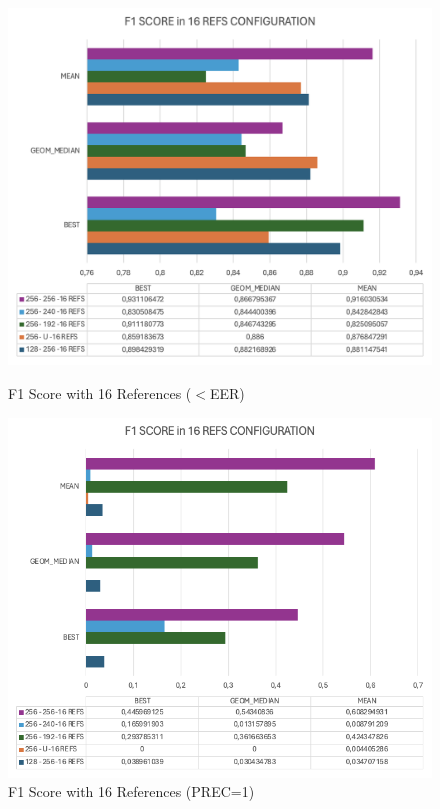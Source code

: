 \begin{figure}[!h]
    \begin{minipage}[b]{0.5\textwidth}
            \centering
            \includegraphics[width=\textwidth]{images/5.05 F1 Score 16 DNN.png}
            \caption{F1 Score with 16 References ($<$EER)}
            \label{fig:f1 score in configurations with 16 refs dnn}
    \end{minipage}
    \hfill
    \begin{minipage}[b]{0.5\textwidth}
            \centering
            \includegraphics[width=\textwidth]{images/5.06 F1 Score 16 DNN prec1.png}
            \caption{F1 Score with 16 References (PREC=1)}
            \label{fig:f1 score in configurations with 16 refs (prec=1) dnn}
    \end{minipage}
\end{figure}
